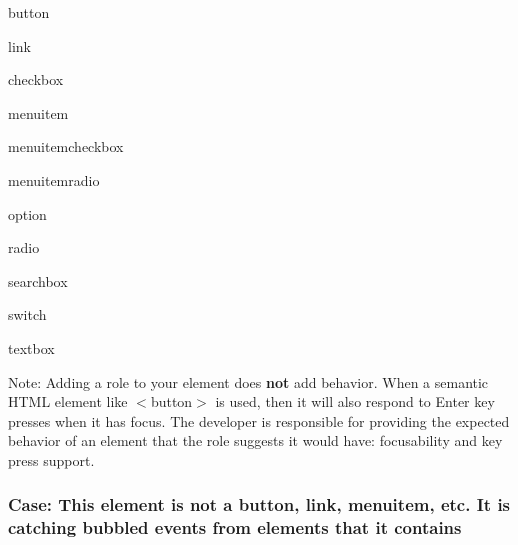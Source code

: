 \begin{DoxyEnumerate}
\item {\ttfamily button}
\end{DoxyEnumerate}
\begin{DoxyEnumerate}
\item {\ttfamily link}
\end{DoxyEnumerate}
\begin{DoxyEnumerate}
\item {\ttfamily checkbox}
\end{DoxyEnumerate}
\begin{DoxyEnumerate}
\item {\ttfamily menuitem}
\end{DoxyEnumerate}
\begin{DoxyEnumerate}
\item {\ttfamily menuitemcheckbox}
\end{DoxyEnumerate}
\begin{DoxyEnumerate}
\item {\ttfamily menuitemradio}
\end{DoxyEnumerate}
\begin{DoxyEnumerate}
\item {\ttfamily option}
\end{DoxyEnumerate}
\begin{DoxyEnumerate}
\item {\ttfamily radio}
\end{DoxyEnumerate}
\begin{DoxyEnumerate}
\item {\ttfamily searchbox}
\end{DoxyEnumerate}
\begin{DoxyEnumerate}
\item {\ttfamily switch}
\end{DoxyEnumerate}
\begin{DoxyEnumerate}
\item {\ttfamily textbox}
\end{DoxyEnumerate}

Note\+: Adding a role to your element does {\bfseries not} add behavior. When a semantic H\+T\+ML element like {\ttfamily $<$button$>$} is used, then it will also respond to Enter key presses when it has focus. The developer is responsible for providing the expected behavior of an element that the role suggests it would have\+: focusability and key press support.

\subsubsection*{Case\+: This element is not a button, link, menuitem, etc. It is catching bubbled events from elements that it contains}

